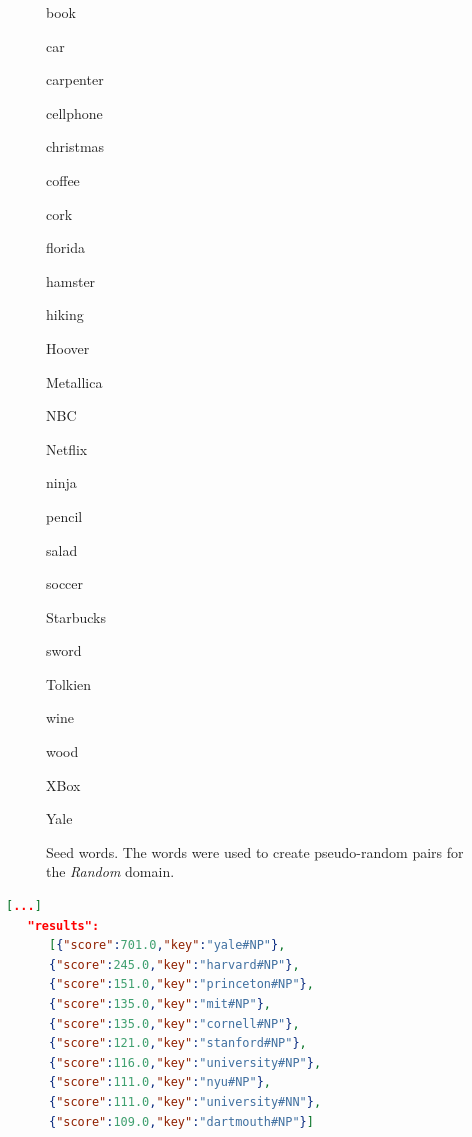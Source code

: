 \begin{figure}[bth]
\centering
\caption{Seed words. The words were used to create pseudo-random pairs for the \emph{Random} domain. }
\label{fig:seed}
\begin{multicols}{5}
book%

car%

carpenter%

cellphone%

christmas%

coffee%

cork%

florida%

hamster%

hiking

Hoover%

Metallica%

NBC%

Netflix%

ninja%

pencil%

salad%

soccer%

Starbucks%

sword%

Tolkien%

wine%

wood%

XBox%

Yale%
\end{multicols}

\end{figure}

\begin{minipage}{\linewidth}
\begin{lstlisting}[language=json,label=lst:jbtres,caption=JoBimTexts response. Shows similar words to \emph{\enquote{Yale}}. Those objects can be compared meaningful.]
[...]
   "results":
      [{"score":701.0,"key":"yale#NP"},
      {"score":245.0,"key":"harvard#NP"},
      {"score":151.0,"key":"princeton#NP"},
      {"score":135.0,"key":"mit#NP"},
      {"score":135.0,"key":"cornell#NP"},
      {"score":121.0,"key":"stanford#NP"},
      {"score":116.0,"key":"university#NP"},
      {"score":111.0,"key":"nyu#NP"},
      {"score":111.0,"key":"university#NN"},
      {"score":109.0,"key":"dartmouth#NP"}]
\end{lstlisting}
\end{minipage}

